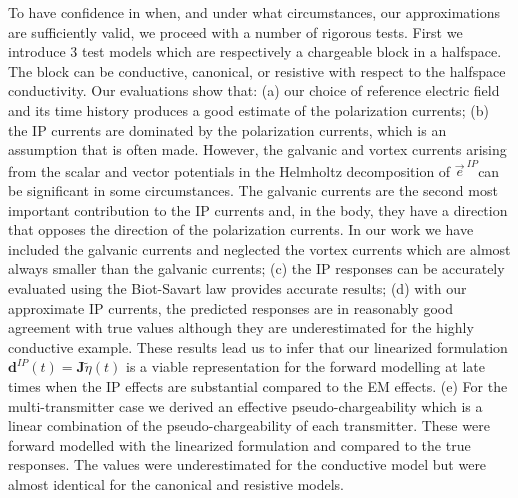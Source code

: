 \documentclass[extra,mreferee]{gji}
\newcommand {\e}  { {\vec e} }
\newcommand{\peta}{\tilde{\eta}}
\begin{document}
To have confidence in when, and under what circumstances, our approximations are sufficiently valid, we proceed with a number of rigorous tests. First we introduce 3 test models which are respectively a chargeable block in a halfspace. The block can be conductive, canonical, or resistive with respect to the halfspace conductivity. Our evaluations show that:
(a) our choice of reference electric field and its time history produces a good estimate of the polarization currents;
(b) the IP currents are dominated by the polarization currents, which is an assumption that is often made. However, the galvanic and vortex currents arising from the scalar and vector potentials in the Helmholtz decomposition of $\e^{\ IP}$can be significant in some circumstances. The galvanic currents are the second most important contribution to the IP currents and, in the body, they have a direction that opposes the direction of the polarization currents. In our work we have included the galvanic currents and neglected the vortex currents which are almost always smaller than the galvanic currents;
(c) the IP responses can be accurately evaluated using the Biot-Savart law provides accurate results;
(d) with our approximate IP currents, the predicted responses are in reasonably good agreement with true values although they are underestimated for the highly conductive example. These results lead us to infer that our linearized formulation $\mathbf{d}^{IP}(t)=\mathbf{J}\peta(t)$ is a viable representation for the forward modelling at late times when  the IP effects are substantial compared to the EM effects.
(e) For the multi-transmitter case we derived an effective pseudo-chargeability which is a linear combination of the pseudo-chargeability of each transmitter. These were forward modelled with the linearized formulation and compared to the true responses. The values were underestimated for the conductive model but were almost identical for the canonical and resistive models.
\end{document}
